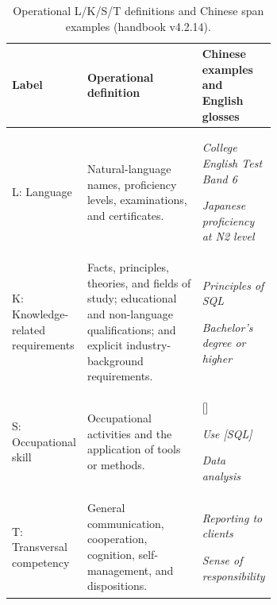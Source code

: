 \begin{table}[!htbp]
\caption{Operational L/K/S/T definitions and Chinese span examples (handbook v4.2.14).}
\label{tab:guide-types}
\centering\small
\setlength{\tabcolsep}{4pt}
\renewcommand{\arraystretch}{1.12}
\begin{tabularx}{\linewidth}{@{}P{0.19\linewidth}P{0.47\linewidth}L@{}}
\toprule
Label & Operational definition & Chinese examples and English glosses \\
\midrule
L: Language & Natural-language names, proficiency levels, examinations, and certificates. & \par\emph{College English Test Band 6}\par\smallskip{}\par\emph{Japanese proficiency at N2 level} \\[3pt]
K: Knowledge-related requirements & Facts, principles, theories, and fields of study; educational and non-language qualifications; and explicit industry-background requirements. & \par\emph{Principles of SQL}\par\smallskip{}\par\emph{Bachelor's degree or higher} \\[3pt]
S: Occupational skill & Occupational activities and the application of tools or methods. & []\par\emph{Use [SQL]}\par\smallskip{}\par\emph{Data analysis} \\[3pt]
T: Transversal competency & General communication, cooperation, cognition, self-management, and dispositions. & \par\emph{Reporting to clients}\par\smallskip{}\par\emph{Sense of responsibility} \\
\bottomrule
\end{tabularx}
\end{table}
